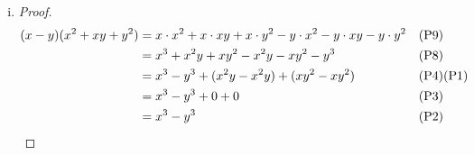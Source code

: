 \documentclass{article}
\begin{document}
\begin{enumerate}[(i).]
\begin{proof}
                \textbf{Case 1:}
                \begin{align*}
                    &\text{If } x - y = 0 \text{,}\\
                    &\text{then } (x - y) + y = 0 + y \text{;}\\
                    &\text{hence } x + (-y + y) = y \text{;} &&\text{(P1)(P2)}\\
                    &\text{hence } x + 0 = y \text{;} &&\text{(P3)}\\
                    &\text{consequently } x = y \text{.} &&\text{(P2)}
                \end{align*}
              
                \textbf{Case 2:}
                \begin{align*}
                    &\text{If } x + y = 0 \text{,}\\
                    &\text{then } (x + y) - y = 0 - y \text{;}\\
                    &\text{hence } x + (y - y) = -y \text{;} &&\text{(P1)(P2)}\\
                    &\text{hence } x + 0 = -y \text{;} &&\text{(P3)}\\
                    &\text{consequently } x = -y \text{.} &&\text{(P2)} \qedhere
                \end{align*}
            \end{proof}

        \item
            \begin{proof}
                \begin{align*}
                    (x - y)(x^{2} + xy + y^{2}) &= x \cdot x^{2} + x \cdot xy + x \cdot y^{2} - y \cdot x^{2} - y \cdot xy - y \cdot y^{2} &&\text{(P9)}\\
                    &= x^{3} + x^{2}y + xy^{2} - x^{2}y - xy^{2} - y^{3} &&\text{(P8)}\\
                    &= x^{3} - y^{3} + (x^{2}y - x^{2}y) + (xy^{2} - xy^{2}) &&\text{(P4)(P1)}\\
                    &= x^{3} - y^{3} + 0 + 0 &&\text{(P3)}\\
                    &= x^{3} - y^{3} &&\text{(P2)} \qedhere
                \end{align*}
            \end{proof}
    \end{enumerate}
\end{document}
